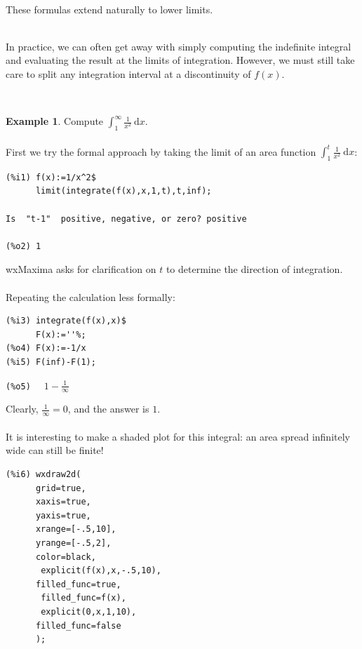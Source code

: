\documentclass[10.5pt,twoside]{report}
\theoremstyle{definition}
\newtheorem{exmp}{Example}[section]
\begin{document}
${}$\\

These formulas extend naturally to lower limits.

${}$\\

In practice, we can often get away with simply computing the indefinite integral and evaluating the result at the limits of integration.  However, we must still take care to split any integration interval at a discontinuity of $f(x)$.

${}$\\

\begin{exmp} Compute $\displaystyle \int_1^{\infty} \frac{1}{x^2}\ \mathrm{d}x$.\\

${}$\\

First we try the formal approach by taking the limit of an area function $\displaystyle \int_1^t \frac{1}{x^2}\ \mathrm{d}x$:

\begin{verbatim}
(%i1) f(x):=1/x^2$
      limit(integrate(f(x),x,1,t),t,inf);
      
Is  "t-1"  positive, negative, or zero? positive

(%o2) 1
\end{verbatim}

wxMaxima asks for clarification on $t$ to determine the direction of integration.\\
${}$\\
Repeating the calculation less formally:

\begin{verbatim}
(%i3) integrate(f(x),x)$
      F(x):=''%;
(%o4) F(x):=-1/x
(%i5) F(inf)-F(1);
\end{verbatim}
\verb|(%o5)  | $1-\frac{1}{\infty}$

Clearly, $\frac{1}{\infty}=0$, and the answer is $1$.\\

${}$\\

It is interesting to make a shaded plot for this integral:  an area spread infinitely wide can still be finite!

\begin{verbatim}
(%i6) wxdraw2d(
      grid=true,
      xaxis=true,
      yaxis=true,
      xrange=[-.5,10],
      yrange=[-.5,2],
      color=black,
       explicit(f(x),x,-.5,10),
      filled_func=true,
       filled_func=f(x),
       explicit(0,x,1,10),
      filled_func=false
      );
\end{verbatim}


\end{exmp}
\end{document}
